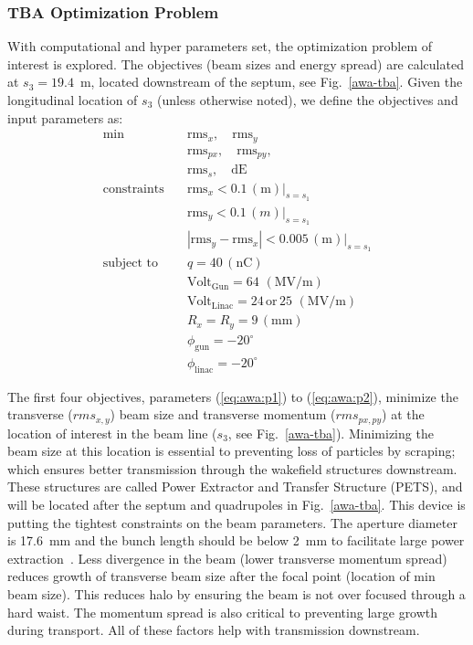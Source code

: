 \subsubsection{TBA Optimization Problem}
With computational and hyper parameters set, 
the optimization problem of interest is explored.
The objectives (beam sizes and energy spread) are calculated at 
$s_3=19.4$~m, located downstream of the septum, see Fig.~\ref{awa-tba}. 
Given the longitudinal location of $s_3$ (unless otherwise noted), 
we define the objectives and input parameters as:
\begin{align}
\text{min}  \quad & \text{rms}_{x}, \quad \text{rms}_{y} \label{eq:awa:p1}\\
& \text{rms}_{px}, \quad \text{rms}_{py}, \label{eq:awa:p2}\\
& \text{rms}_{s}, \quad \text{dE} \label{eq:awa:p4} \\
\text{constraints} \quad & \text{rms}_x < 0.1 \, (\text{m}) |_{s=s_1}\label{eq:awa:c1}\\
\quad & \text{rms}_y < 0.1\, (m) |_{s=s_1}\, \label{eq:awa:c2}\\
\quad & |\text{rms}_y - \text{rms}_x | < 0.005 \, (\text{m}) |_{s=s_1}\label{eq:awa:c3}\\
\text{subject to} \quad & q = 40 \, (\text{nC}) \label{eq:awa:firstconstr}\\
\quad & \text{Volt}_{\text{Gun}} = 64 \, \, (\text{MV/m}) \label{eq:awa:lastconstr}\\
\quad & \text{Volt}_{\text{Linac}} = 24 \, \text{or} \, 25\,\, (\text{MV/m}) \\
\quad & R_x = R_y = 9 \, (\text{mm}) \label{eq:awa:firstdvar}\\
\quad & \phi_{\text{gun}} =-20^\circ \label{eq:awa:gphidvar}\\
\quad & \phi_{\text{linac}} =-20^\circ \label{eq:awa:lastdvar}
\end{align}

The first four objectives, parameters (\ref{eq:awa:p1}) to (\ref{eq:awa:p2}),
minimize the transverse ($rms_{x,y}$) beam size and transverse momentum ($rms_{px,py}$)
at the location of interest in the beam line ($s_3$, see Fig.~\ref{awa-tba}). 
Minimizing the beam size at this location is essential to 
preventing loss of particles by scraping; 
which ensures better transmission through the wakefield structures downstream.
These structures are called Power Extractor and Transfer Structure (PETS), 
and will be located after the septum and quadrupoles in Fig.~\ref{awa-tba}.
This device is putting the tightest constraints on the beam parameters.  
The aperture diameter is \SI{17.6}{mm} and the bunch length should be below \SI{2}{mm}
to facilitate large power extraction~\cite{PETSeq}.   
Less divergence in the beam (lower transverse momentum spread) 
reduces growth of transverse beam size after the focal point (location of min beam size).
This reduces halo by ensuring the beam is not over focused through a hard waist.
The momentum spread is also critical to preventing large growth during transport. 
All of these factors help with transmission downstream. 

